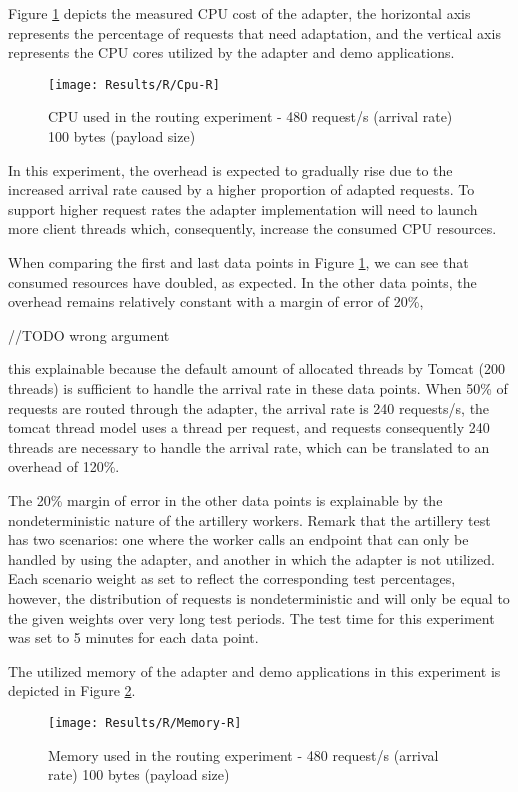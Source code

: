 Figure \ref{fig:routCpu} depicts the measured CPU cost of the adapter, the horizontal axis represents the percentage of requests that need adaptation, and the vertical axis represents the
CPU cores utilized by the adapter and demo applications.

\begin{figure}[htbp]
    \centering
    \centerline{\texttt{[image: Results/R/Cpu-R]}}
    \caption{CPU used in the routing experiment - 480 request/s (arrival rate) 100 bytes (payload size)}
    \label{fig:routCpu}
\end{figure}

In this experiment, the overhead is expected to gradually rise due to the increased arrival rate caused by a higher proportion of adapted requests.
To support higher request rates the adapter implementation will need to launch more client threads which, consequently, increase the consumed CPU resources.

When comparing the first and last data points in Figure \ref{fig:routCpu}, we can see that consumed resources have doubled, as expected.
In the other data points, the overhead remains relatively constant with a margin of error of 20\%,

//TODO wrong argument

this explainable because the default amount of allocated threads by Tomcat (200 threads) is sufficient to handle the arrival rate in these data points.
When 50\% of requests are routed through the adapter, the arrival rate is 240 requests/s, the tomcat thread model uses a thread per request, and requests
consequently 240 threads are necessary to handle the arrival rate, which can be translated to an overhead of 120\%.

The 20\% margin of error in the other data points is explainable by the nondeterministic nature of the artillery workers.
Remark that the artillery test has two scenarios: one where the worker calls an endpoint that can only be handled by using the adapter, and another in which the adapter is not utilized.
Each scenario weight as set to reflect the corresponding test percentages,
however, the distribution of requests is nondeterministic and will only be equal to the given weights over very long test periods.
The test time for this experiment was set to 5 minutes for each data point.

The utilized memory of the adapter and demo applications in this experiment is depicted in Figure \ref{fig:routMem}.

\begin{figure}[htbp]
    \centering
    \centerline{\texttt{[image: Results/R/Memory-R]}}
    \caption{Memory used in the routing experiment - 480 request/s (arrival rate) 100 bytes (payload size)}
    \label{fig:routMem}
\end{figure}

